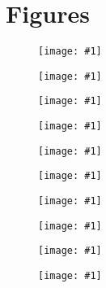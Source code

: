 \documentclass[11pt]{article}
\newcommand{\scalefigone}[3]{
  \begin{figure}[ht!]
    \centering
    \texttt{[image: \#1]}
    \caption{#3}
    \label{#1}
  \end{figure}}
\begin{document}
\clearpage
\section{Figures}

\scalefigone{fig1}{1.0}{}

\scalefigone{fig2}{1.0}{}

\scalefigone{fig3}{0.8}{}

\scalefigone{fig4}{1.0}{}

\scalefigone{fig5}{1.0}{}

\scalefigone{fig6}{0.5}{}

\scalefigone{fig7}{1.0}{}

\scalefigone{fig8}{1.0}{}

\scalefigone{fig9}{0.5}{}

\scalefigone{fig10}{1.0}{}
\end{document}
